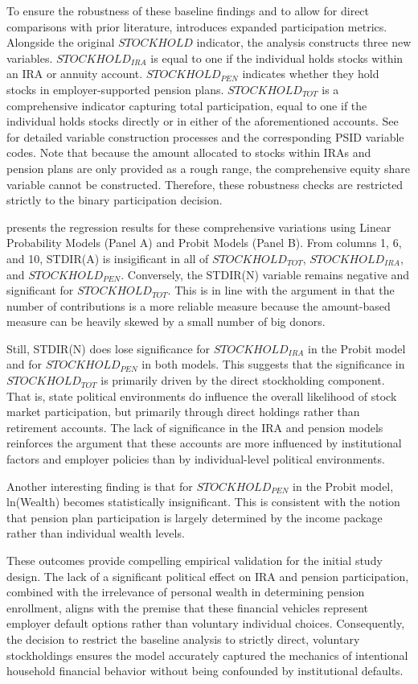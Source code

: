 To ensure the robustness of these baseline findings and to allow for direct comparisons with prior literature,  introduces expanded participation metrics. Alongside the original $STOCKHOLD$ indicator, the analysis constructs three new variables. $STOCKHOLD_{IRA}$ is equal to one if the individual holds stocks within an IRA or annuity account. $STOCKHOLD_{PEN}$ indicates whether they hold stocks in employer-supported pension plans. $STOCKHOLD_{TOT}$ is a comprehensive indicator capturing total participation, equal to one if the individual holds stocks directly or in either of the aforementioned accounts. See  for detailed variable construction processes and the corresponding PSID variable codes. Note that because the amount allocated to stocks within IRAs and pension plans are only provided as a rough range, the comprehensive equity share variable cannot be constructed. Therefore, these robustness checks are restricted strictly to the binary participation decision. 

 presents the regression results for these comprehensive variations using Linear Probability Models (Panel A) and Probit Models (Panel B). From columns 1, 6, and 10, STDIR(A) is insigificant in all of $STOCKHOLD_{TOT}$, $STOCKHOLD_{IRA}$, and $STOCKHOLD_{PEN}$. Conversely, the STDIR(N) variable remains negative and significant for $STOCKHOLD_{TOT}$. This is in line with the argument in \citet{meeuwis2022} that the number of contributions is a more reliable measure because the amount-based measure can be heavily skewed by a small number of big donors. 

Still, STDIR(N) does lose significance for $STOCKHOLD_{IRA}$ in the Probit model and for $STOCKHOLD_{PEN}$ in both models. This suggests that the significance in $STOCKHOLD_{TOT}$ is primarily driven by the direct stockholding component. That is, state political environments do influence the overall likelihood of stock market participation, but primarily through direct holdings rather than retirement accounts. The lack of significance in the IRA and pension models reinforces the argument that these accounts are more influenced by institutional factors and employer policies than by individual-level political environments.

Another interesting finding is that for $STOCKHOLD_{PEN}$ in the Probit model, ln(Wealth) becomes statistically insignificant. This is consistent with the notion that pension plan participation is largely determined by the income package rather than individual wealth levels. 

These outcomes provide compelling empirical validation for the initial study design. The lack of a significant political effect on IRA and pension participation, combined with the irrelevance of personal wealth in determining pension enrollment, aligns with the premise that these financial vehicles represent employer default options rather than voluntary individual choices. Consequently, the decision to restrict the baseline analysis to strictly direct, voluntary stockholdings ensures the model accurately captured the mechanics of intentional household financial behavior without being confounded by institutional defaults.